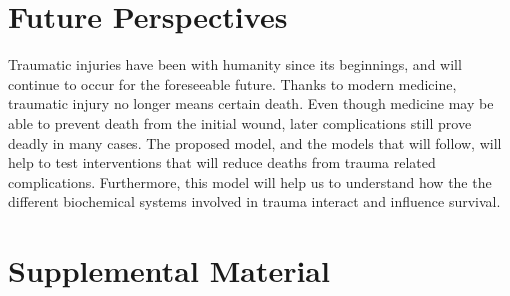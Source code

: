 \documentclass[12pt]{article}
\newcommand{\beginsupplement}{%
        \setcounter{table}{0}
        \renewcommand{\thetable}{S\arabic{table}}%
        \setcounter{figure}{0}
        \renewcommand{\thefigure}{S\arabic{figure}}%
     }
\begin{document}
\section*{Future Perspectives}
Traumatic injuries have been with humanity since its beginnings, and will continue to occur for the foreseeable future. Thanks to modern medicine, traumatic injury no longer means certain death. Even though medicine may be able to prevent death from the initial wound, later complications still prove deadly in many cases. The proposed model, and the models that will follow, will help to test interventions that will reduce deaths from trauma related complications. Furthermore, this model will help us to understand how the the different biochemical systems involved in trauma interact and influence survival. 
 
\newpage


\pagebreak
\beginsupplement
\section*{Supplemental Material}
\end{document}
